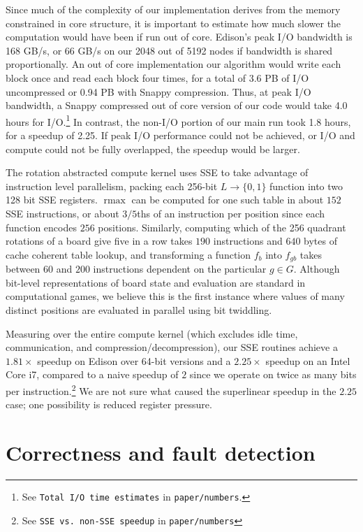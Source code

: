 \documentclass[conference]{IEEEtran}
\DeclareMathOperator{\rmax}{rmax}
\begin{document}
Since much of the complexity of our implementation derives from the memory constrained in core
structure, it is important to estimate how much slower the computation would have been if run out of core.
Edison's peak I/O bandwidth is 168 GB/s, or 66 GB/s on our 2048 out of 5192 nodes if bandwidth is shared
proportionally.  An out of core implementation our algorithm would write each block once and read each block
four times, for a total of 3.6 PB of I/O uncompressed or 0.94 PB with Snappy compression.  Thus, at peak I/O
bandwidth, a Snappy compressed out of core version of our code would take 4.0 hours for
I/O.\cprotect\footnote{See \verb+Total I/O time estimates+ in \verb+paper/numbers+.}  In contrast,
the non-I/O portion of our main run took 1.8 hours, for a speedup of 2.25.  If peak I/O performance could
not be achieved, or I/O and compute could not be fully overlapped, the speedup would be larger.

The rotation abstracted compute kernel uses SSE to take advantage of instruction level parallelism, packing
each 256-bit $L \to \{0,1\}$ function into two 128 bit SSE registers.  $\rmax$ can be computed for one such
table in about $152$ SSE instructions, or about $3/5$ths of an instruction per position since each function
encodes $256$ positions.  Similarly, computing which of the 256 quadrant rotations of a board give five in
a row takes $190$ instructions and $640$ bytes of cache coherent table lookup, and transforming a
function $f_b$ into $f_{gb}$ takes between $60$ and $200$ instructions dependent on the particular $g \in G$.
Although bit-level representations of board state and evaluation are standard in computational games,
we believe this is the first instance where values of many distinct positions are evaluated in parallel
using bit twiddling.

Measuring over the entire compute kernel (which excludes idle time, communication, and compression/decompression),
our SSE routines achieve a $1.81\times$ speedup on Edison over 64-bit versions and a $2.25\times$ speedup on
an Intel Core i7, compared to a naive speedup of $2$ since we operate on twice as many bits per
instruction.\cprotect\footnote{See \verb+SSE vs. non-SSE speedup+ in \verb+paper/numbers+}  We are not sure what
caused the superlinear speedup in the $2.25$ case; one possibility is reduced register pressure.

\section{Correctness and fault detection}
\end{document}
